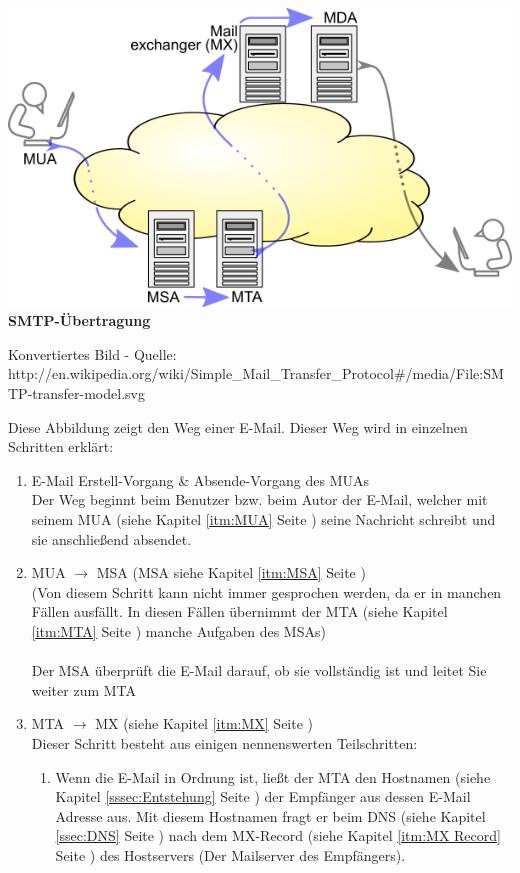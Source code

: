\documentclass[12pt,a4paper]{report}
\begin{document}
\begin{onehalfspace}
\begin{center}
\includegraphics[scale=0.5]{../docs/lyaton/graphics/SMTP-Uebertragung.png}\\
\textbf{SMTP-Übertragung}\\
\begin{scriptsize}
Konvertiertes Bild - Quelle:\\
http://en.wikipedia.org/wiki/Simple\_Mail\_Transfer\_Protocol\#/media/File:SMTP-transfer-model.svg
\end{scriptsize}
\end{center}
Diese Abbildung zeigt den Weg einer E-Mail. Dieser Weg wird in einzelnen Schritten erklärt:
\begin{enumerate}
\item E-Mail Erstell-Vorgang \& Absende-Vorgang des MUAs\\
Der Weg beginnt beim Benutzer bzw. beim Autor der E-Mail, welcher mit seinem MUA (siehe Kapitel \ref{itm:MUA} Seite \pageref{itm:MUA}) seine Nachricht schreibt und sie anschließend absendet.
\item MUA $\rightarrow$ MSA (MSA siehe Kapitel \ref{itm:MSA} Seite \pageref{itm:MSA})\\
(Von diesem Schritt kann nicht immer gesprochen werden, da er in manchen Fällen ausfällt. In diesen Fällen übernimmt der MTA (siehe Kapitel \ref{itm:MTA} Seite \pageref{itm:MTA}) manche Aufgaben des MSAs)\\\\
Der MSA überprüft die E-Mail darauf, ob sie vollständig ist und leitet Sie weiter zum MTA
\item MTA $\rightarrow$ MX  (siehe Kapitel \ref{itm:MX} Seite \pageref{itm:MX})\\
Dieser Schritt besteht aus einigen nennenswerten Teilschritten:
\begin{enumerate}
\item Wenn die E-Mail in Ordnung ist, ließt der MTA den Hostnamen (siehe Kapitel \ref{sssec:Entstehung} Seite \pageref{sssec:Entstehung}) der Empfänger aus dessen E-Mail Adresse aus. Mit diesem Hostnamen fragt er beim DNS (siehe Kapitel \ref{ssec:DNS} Seite \pageref{ssec:DNS}) nach dem  MX-Record (siehe Kapitel \ref{itm:MX Record} Seite \pageref{itm:MX Record}) des Hostservers (Der Mailserver des Empfängers).

\end{enumerate}
\end{enumerate}
\end{onehalfspace}
\end{document}
